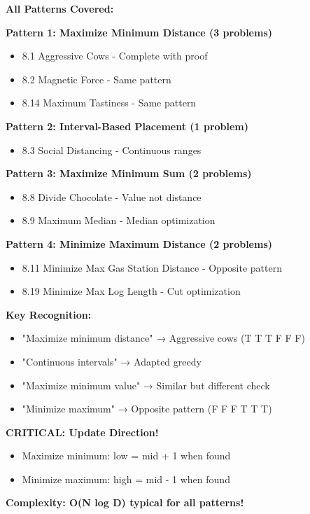 \documentclass[11pt,a4paper,oneside]{book}
\begin{document}
\begin{tcolorbox}[
    enhanced,breakable,
    colback=primaryblue!10,
    colframe=primaryblue,
    boxrule=2pt,
    arc=4mm,
    title=\textbf{Placement Problems: Complete Mastery}
]
\textbf{All Patterns Covered:}

\textbf{Pattern 1: Maximize Minimum Distance (3 problems)}
\begin{itemize}
\item 8.1 Aggressive Cows - Complete with proof
\item 8.2 Magnetic Force - Same pattern
\item 8.14 Maximum Tastiness - Same pattern
\end{itemize}

\textbf{Pattern 2: Interval-Based Placement (1 problem)}
\begin{itemize}
\item 8.3 Social Distancing - Continuous ranges
\end{itemize}

\textbf{Pattern 3: Maximize Minimum Sum (2 problems)}
\begin{itemize}
\item 8.8 Divide Chocolate - Value not distance
\item 8.9 Maximum Median - Median optimization
\end{itemize}

\textbf{Pattern 4: Minimize Maximum Distance (2 problems)}
\begin{itemize}
\item 8.11 Minimize Max Gas Station Distance - Opposite pattern
\item 8.19 Minimize Max Log Length - Cut optimization
\end{itemize}

\textbf{Key Recognition:}
\begin{itemize}
\item "Maximize minimum distance" → Aggressive cows (T T T F F F)
\item "Continuous intervals" → Adapted greedy
\item "Maximize minimum value" → Similar but different check
\item "Minimize maximum" → Opposite pattern (F F F T T T)
\end{itemize}

\textbf{CRITICAL: Update Direction!}
\begin{itemize}
\item Maximize minimum: low = mid + 1 when found
\item Minimize maximum: high = mid - 1 when found
\end{itemize}

\textbf{Complexity: O(N log D) typical for all patterns!}
\end{tcolorbox}
\end{document}
